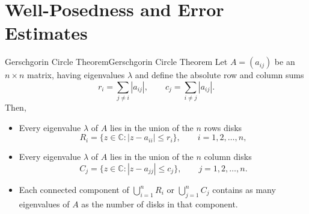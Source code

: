 \documentclass[../main.tex]{subfiles}
\begin{document}
\section{Well-Posedness and Error Estimates}
\begin{theorem}{Gerschgorin Circle Theorem}{Gerschgorin Circle Theorem}
	Let $A = (a_{ij})$ be an $n \times n$ matrix, having eigenvalues $\lambda$ and define the absolute row and column sums
	\begin{equation}
		r_i = \sum_{j \neq i} |a_{ij}|, \qquad c_j = \sum_{i \neq j} |a_{ij}|.
	\end{equation}
	Then,
	\begin{itemize}
		\item Every eigenvalue $\lambda$ of $A$ lies in the union of the $n$ rows disks
		      \begin{equation}
			      R_i = \{ z \in \mathbb{C} : |z - a_{ii}| \leq r_i \}, \qquad i = 1, 2, \ldots, n,
		      \end{equation}
		\item Every eigenvalue $\lambda$ of $A$ lies in the union of the $n$ column disks
		      \begin{equation}
			      C_j = \{ z \in \mathbb{C} : |z - a_{jj}| \leq c_j \}, \qquad j = 1, 2, \ldots, n.
		      \end{equation}
		\item Each connected component of $\bigcup_{i=1}^n R_i$ or $\bigcup_{j=1}^n C_j$ contains as many eigenvalues of $A$ as the number of disks in that component.
	\end{itemize}
\end{theorem}
\end{document}
